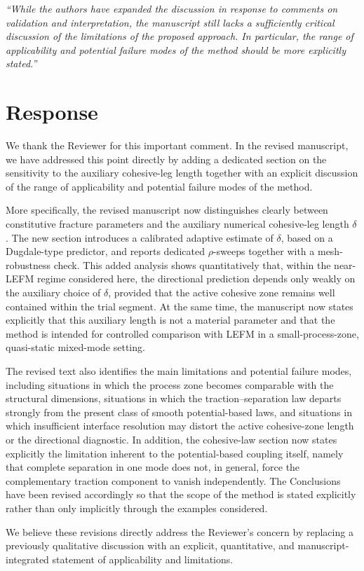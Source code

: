 \documentclass[12pt,a4paper]{article}
\begin{document}
	\begin{tcolorbox}[reviewerbox]
		\emph{``While the authors have expanded the discussion in response to comments on validation and interpretation, the manuscript still lacks a sufficiently critical discussion of the limitations of the proposed approach. In particular, the range of applicability and potential failure modes of the method should be more explicitly stated.''}
	\end{tcolorbox}
	
	\section*{Response}
	
	\begin{tcolorbox}[authorbox]
		We thank the Reviewer for this important comment. In the revised manuscript, we have addressed this point directly by adding a dedicated section on the sensitivity to the auxiliary cohesive-leg length together with an explicit discussion of the range of applicability and potential failure modes of the method.
		
		More specifically, the revised manuscript now distinguishes clearly between constitutive fracture parameters and the auxiliary numerical cohesive-leg length \(\delta\). The new section introduces a calibrated adaptive estimate of \(\delta\), based on a Dugdale-type predictor, and reports dedicated \(\rho\)-sweeps together with a mesh-robustness check. This added analysis shows quantitatively that, within the near-LEFM regime considered here, the directional prediction depends only weakly on the auxiliary choice of \(\delta\), provided that the active cohesive zone remains well contained within the trial segment. At the same time, the manuscript now states explicitly that this auxiliary length is not a material parameter and that the method is intended for controlled comparison with LEFM in a small-process-zone, quasi-static mixed-mode setting.
		
		The revised text also identifies the main limitations and potential failure modes, including situations in which the process zone becomes comparable with the structural dimensions, situations in which the traction--separation law departs strongly from the present class of smooth potential-based laws, and situations in which insufficient interface resolution may distort the active cohesive-zone length or the directional diagnostic. In addition, the cohesive-law section now states explicitly the limitation inherent to the potential-based coupling itself, namely that complete separation in one mode does not, in general, force the complementary traction component to vanish independently. The Conclusions have been revised accordingly so that the scope of the method is stated explicitly rather than only implicitly through the examples considered.
		
		We believe these revisions directly address the Reviewer’s concern by replacing a previously qualitative discussion with an explicit, quantitative, and manuscript-integrated statement of applicability and limitations.
	\end{tcolorbox}
	
\end{document}

